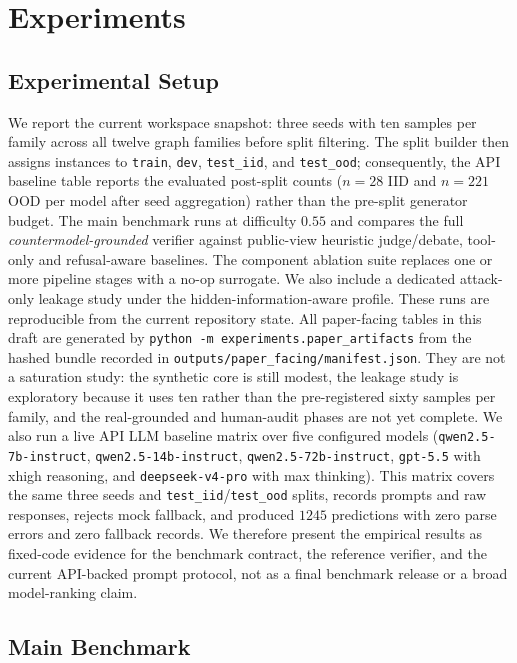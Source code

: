 \documentclass{article}
\theoremstyle{plain}
\theoremstyle{definition}
\theoremstyle{remark}
\begin{document}
\section{Experiments}
\label{sec:experiments}

\subsection{Experimental Setup}
\label{sec:setup}

We report the current workspace snapshot: three seeds with ten samples per
family across all twelve graph families before split filtering. The split
builder then assigns instances to \texttt{train}, \texttt{dev},
\texttt{test\_iid}, and \texttt{test\_ood}; consequently, the API baseline table
reports the evaluated post-split counts ($n=28$ IID and $n=221$ OOD per model
after seed aggregation) rather than the pre-split generator budget. The main
benchmark runs at difficulty $0.55$ and compares the full
\emph{countermodel-grounded} verifier against public-view heuristic
judge/debate, tool-only and refusal-aware baselines. The component ablation
suite replaces one or more pipeline stages with a no-op surrogate. We also
include a dedicated attack-only leakage study under the
hidden-information-aware profile. These runs are reproducible from the current
repository state. All paper-facing tables in this draft are generated by
\texttt{python -m experiments.paper\_artifacts} from the hashed bundle recorded
in \texttt{outputs/paper\_facing/manifest.json}. They are not a saturation
study: the synthetic core is still modest, the leakage study is exploratory
because it uses ten rather than the pre-registered sixty samples per family,
and the real-grounded and human-audit phases are not yet complete. We also
run a live API LLM baseline matrix over five configured models
(\texttt{qwen2.5-7b-instruct}, \texttt{qwen2.5-14b-instruct},
\texttt{qwen2.5-72b-instruct}, \texttt{gpt-5.5} with xhigh reasoning, and
\texttt{deepseek-v4-pro} with max thinking). This matrix covers the same
three seeds and \texttt{test\_iid}/\texttt{test\_ood} splits, records prompts
and raw responses, rejects mock fallback, and produced $1245$ predictions with
zero parse errors and zero fallback records. We therefore present the empirical
results as fixed-code evidence for the benchmark contract, the reference
verifier, and the current API-backed prompt protocol, not as a final benchmark
release or a broad model-ranking claim.

\subsection{Main Benchmark}
\end{document}
